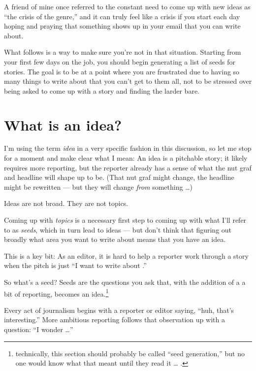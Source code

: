 \documentclass[
  12pt,
  american,
  letterpaperpaper,
  extrafontsizes,onecolumn,openright
  ]{memoir}
\begin{document}
A friend of mine once referred to the constant need to come up with new ideas as \enquote{the crisis of the genre,} and it can truly feel like a crisis if you start each day hoping and praying that something shows up in your email that you can write about.

What follows is a way to make sure you're not in that situation. Starting from your first few days on the job, you should begin generating a list of seeds for stories. The goal is to be at a point where you are frustrated due to having so many things to write about that you can't get to them all, not to be stressed over being asked to come up with a story and finding the larder bare.

\hypertarget{what-is-an-idea}{%
\section*{What is an idea?}\label{what-is-an-idea}}

I'm using the term \emph{idea} in a very specific fashion in this discussion, so let me stop for a moment and make clear what I mean: An idea is a pitchable story; it likely requires more reporting, but the reporter already has a sense of what the nut graf and headline will shape up to be. (That nut graf might change, the headline might be rewritten --- but they will change \emph{from} something \ldots)

Ideas are not broad. They are not topics.

Coming up with \emph{topics} is a necessary first step to coming up with what I'll refer to as \emph{seeds}, which in turn lead to ideas --- but don't think that figuring out broadly what area you want to write about means that you have an idea.

This is a key bit: As an editor, it is hard to help a reporter work through a story when the pitch is just \enquote{I want to write about .}

So what's a seed? Seeds are the questions you ask that, with the addition of a a bit of reporting, becomes an idea.\footnote{technically, this section should probably be called \enquote{seed generation,} but no one would know what that meant until they read it \ldots{} .}

Every act of journalism begins with a reporter or editor saying, \enquote{huh, that's interesting.} More ambitious reporting follows that observation up with a question: \enquote{I wonder \ldots{}}
\end{document}
